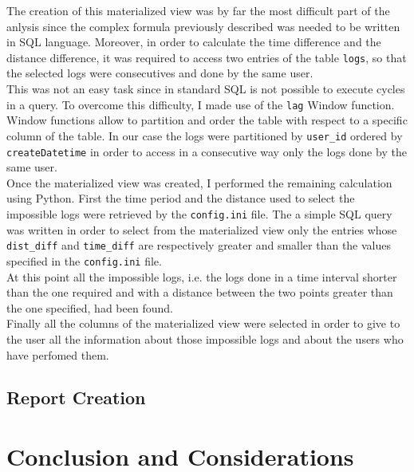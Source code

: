 \documentclass[12pt, a4paper, oneside]{article}
\begin{document}
The creation of this materialized view was by far the most difficult part of the anlysis since the complex formula previously described was needed to be written
in SQL language. Moreover, in order to calculate the time difference and the distance difference, it was required to access two entries of the table \texttt{logs}, so that
the selected logs were consecutives and done by the same user. \\
This was not an easy task since in standard SQL is not possible to execute cycles in a query. To overcome this difficulty, I made use of the \texttt{lag}
Window function. Window functions allow to partition and order the table with respect to a specific column of the table. In our case the logs were partitioned
by \texttt{user\_id} ordered by \texttt{createDatetime} in order to access in a consecutive way only the logs done by the same user.\\
Once the materialized view was created, I performed the remaining calculation using Python. First the time period and the distance used to select the impossible
logs were retrieved by the \texttt{config.ini} file. The a simple SQL query was written in order to select from the materialized view only the entries whose 
\texttt{dist\_diff} and \texttt{time\_diff} are respectively greater and smaller than the values specified in the \texttt{config.ini} file.\\
At this point all the impossible logs, i.e. the logs done in a time interval shorter than the one required and with a distance between the two points greater than the one specified,
had been found.\\
Finally all the columns of the materialized view were selected in order to give to the user all the information about those impossible logs and about the users
who have perfomed them.








\subsection{Report Creation}
\section{Conclusion and Considerations}
\end{document}
